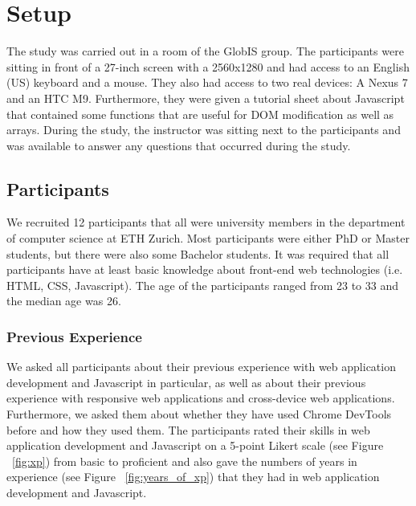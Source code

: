 
\section{Setup}

The study was carried out in a room of the GlobIS group. The participants were sitting in front of a 27-inch screen with a 2560x1280 and had access to an English (US) keyboard and a mouse. They also had access to two real devices: A Nexus 7 and an HTC M9. Furthermore, they were given a tutorial sheet about Javascript that contained some functions that are useful for DOM modification as well as arrays. During the study, the instructor was sitting next to the participants and was available to answer any questions that occurred during the study. 

\subsection{Participants}

We recruited 12 participants that all were university members in the department of computer science at ETH Zurich. Most participants were either PhD or Master students, but there were also some Bachelor students. It was required that all participants have at least basic knowledge about front-end web technologies (i.e. HTML, CSS, Javascript). The age of the participants ranged from 23 to 33 and the median age was 26. 

\subsubsection{Previous Experience}
We asked all participants about their previous experience with web application development and Javascript in particular, as well as about their previous experience with responsive web applications and cross-device web applications. Furthermore, we asked them about whether they have used Chrome DevTools before and how they used them. The participants rated their skills in web application development and Javascript on a 5-point Likert scale (see Figure ~\ref{fig:xp}) from basic to proficient and also gave the numbers of years in experience (see Figure ~\ref{fig:years_of_xp}) that they had in web application development and Javascript.

